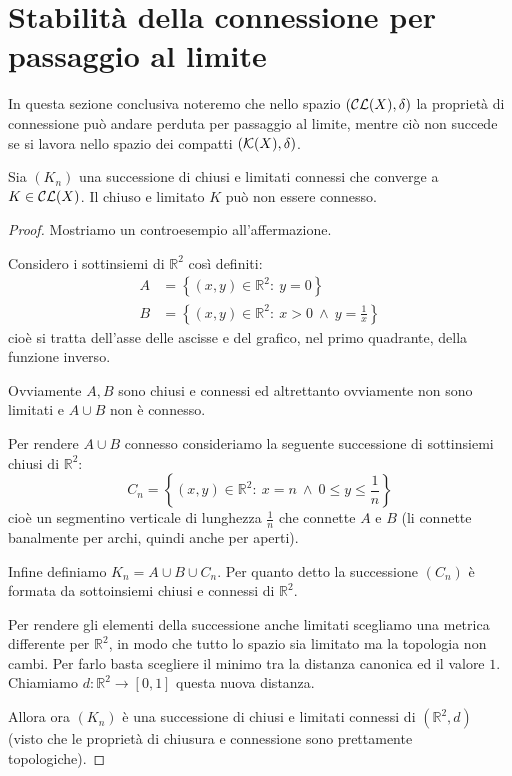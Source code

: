 \section{Stabilità della connessione per passaggio al limite}
In questa sezione conclusiva noteremo che nello spazio $(\mathcal{CL}(X),\delta)$ la proprietà di connessione può andare perduta per passaggio al limite, mentre ciò non succede se si lavora nello spazio dei compatti $(\mathcal{K}(X),\delta)$.

\begin{theorem}
	Sia $(K_n)$ una successione di chiusi e limitati connessi che converge a $K\in\mathcal{CL}(X)$. Il chiuso e limitato $K$ può non essere connesso.
\end{theorem}
\begin{proof}
	Mostriamo un controesempio all'affermazione.
	
	Considero i sottinsiemi di $\mathbb R^2$ così definiti:
	\begin{align*}
		A&=\left\{(x,y)\in\mathbb R^2:\ y=0\right\}\\
		B&=\left\{(x,y)\in\mathbb R^2:\ x> 0\ \wedge\ y=\frac 1x \right\}
	\end{align*}
	cioè si tratta dell'asse delle ascisse e del grafico, nel primo quadrante, della funzione inverso.
	
	Ovviamente $A,B$ sono chiusi e connessi ed altrettanto ovviamente non sono limitati e $A\cup B$ non è connesso.
	
	Per rendere $A\cup B$ connesso consideriamo la seguente successione di sottinsiemi chiusi di $\mathbb R^2$:
	\begin{equation}
		C_n=\left\{(x,y)\in\mathbb R^2:\ x=n\ \wedge\ 0\le y\le \frac 1n\right\}
	\end{equation}
	cioè un segmentino verticale di lunghezza $\frac 1n$ che connette $A$ e $B$ (li connette banalmente per archi, quindi anche per aperti).
	
	Infine definiamo $K_n=A\cup B\cup C_n$. Per quanto detto la successione $(C_n)$ è formata da sottoinsiemi chiusi e connessi di $\mathbb R^2$.
	
	Per rendere gli elementi della successione anche limitati scegliamo una metrica differente per $\mathbb R^2$, in modo che tutto lo spazio sia limitato ma la topologia non cambi. Per farlo basta scegliere il minimo tra la distanza canonica ed il valore $1$. Chiamiamo $d:\mathbb R^2\to [0,1]$ questa nuova distanza.
	
	Allora ora $(K_n)$ è una successione di chiusi e limitati connessi di $(\mathbb R^2, d)$ (visto che le proprietà di chiusura e connessione sono prettamente topologiche).
	

\end{proof}
